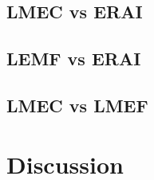 \subsection{LMEC vs ERAI}

\subsection{LEMF vs ERAI}

\subsection{LMEC vs LMEF}

\section{Discussion}
\label{discuss}






